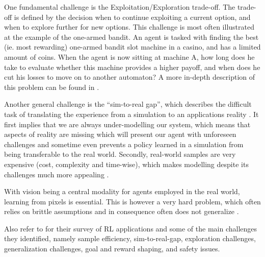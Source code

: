 \documentclass[twoside,11pt]{article}
\begin{document}
\begin{enumerate}
One fundamental challenge is the Exploitation/Exploration trade-off. The trade-off is defined by the decision when to continue exploiting a current option, and when to explore further for new options. This challenge is most often illustrated at the example of the one-armed bandit. An agent is tasked with finding the best (ie. most rewarding) one-armed bandit slot machine in a casino, and has a limited amount of coins. When the agent is now sitting at machine A, how long does he take to evaluate whether this machine provides a higher payoff, and when does he cut his losses to move on to another automaton? A more in-depth description of this problem can be found in \citet{AudibertMunosSzepesv:2009:ExplorationExploitation}.

Another general challenge is the ``sim-to-real gap'', which describes the difficult task of translating the experience from a simulation to an applications reality \citep{ZagalJavierVallejos:2004:RealityGap}. It first implies that we are always under-modelling our system, which means that aspects of reality are missing which will present our agent with unforeseen challenges and sometime even prevents a policy learned in a simulation from being transferable to the real world. Secondly, real-world samples are very expensive (cost, complexity and time-wise), which makes modelling despite its challenges much more appealing  \citep{KoberBagnellPeters:2013:RLRoboticsSurvey}.

With vision being a central modality for agents employed in the real world, learning from pixels is essential. This is however a very hard problem, which often relies on brittle assumptions and in consequence often does not generalize \citep{TomarEtAl:2021:LearnPixelControlRepresentations}. 

Also refer to \citet{ibarz2021train} for their survey of RL applications and some of the main challenges they identified, namely sample efficiency, sim-to-real-gap, exploration challenges, generalization challenges, goal and reward shaping, and safety issues. 


\end{enumerate}
\end{document}
